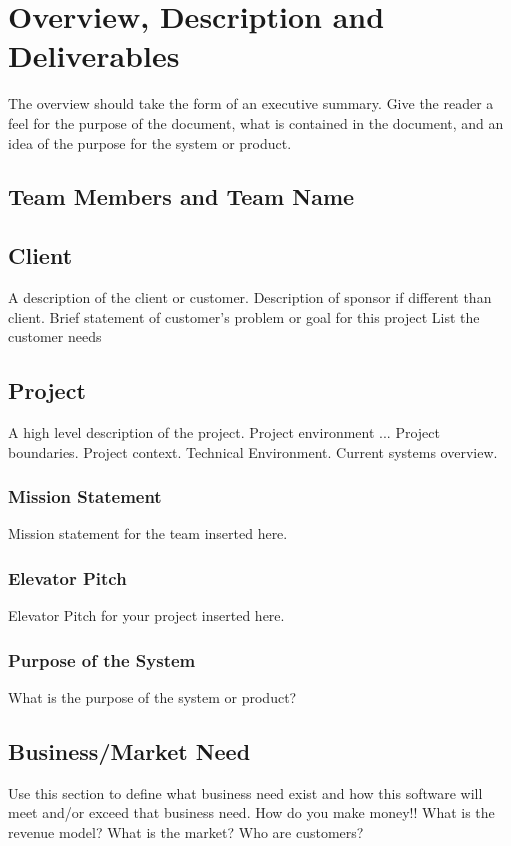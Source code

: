 

\chapter{Overview, Description and Deliverables}

The overview should take the form of an executive summary.  Give the reader a feel 
for the purpose of the document, what is contained in the document, and an idea 
of the purpose for the system or product. 

\section{Team Members and Team Name}


\section{Client}
A description of the client or customer.
Description of sponsor if different than client.
Brief statement of customer's problem or goal for this project
List the customer needs

\section{Project}
A high level description of the project.  Project environment ...
Project boundaries.
Project context.
Technical Environment.
Current systems overview.


\subsection{Mission Statement}
Mission statement for the team inserted here.   

\subsection{Elevator Pitch}
Elevator Pitch for your project inserted here.   

\subsection{Purpose of the System}
What is the purpose of the system or product? 


\section{Business/Market Need}
Use this section to define what business need exist and how this software will 
meet and/or exceed that business need.    How do you make money!!  What is the revenue model?  What is the market? Who are customers?

